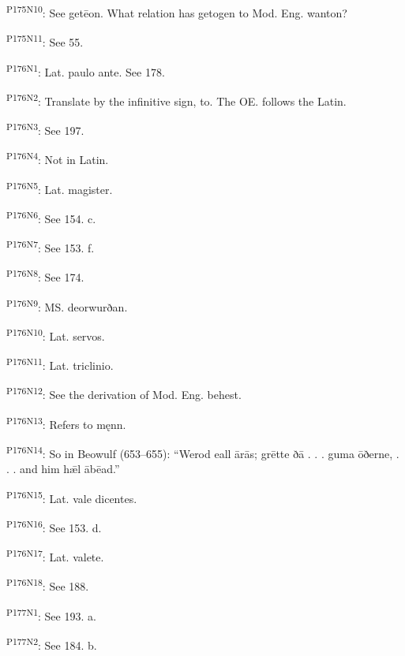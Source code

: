 \textsuperscript{P175N10}: See getēon. What relation has getogen to Mod. Eng. wanton?

\textsuperscript{P175N11}: See 55.

\textsuperscript{P176N1}: Lat. paulo ante. See 178.

\textsuperscript{P176N2}: Translate by the infinitive sign, to. The OE. follows the Latin.

\textsuperscript{P176N3}: See 197.

\textsuperscript{P176N4}: Not in Latin.

\textsuperscript{P176N5}: Lat. magister.

\textsuperscript{P176N6}: See 154. c.

\textsuperscript{P176N7}: See 153. f.

\textsuperscript{P176N8}: See 174.

\textsuperscript{P176N9}: MS. deorwurðan.

\textsuperscript{P176N10}: Lat. servos.

\textsuperscript{P176N11}: Lat. triclinio.

\textsuperscript{P176N12}: See the derivation of Mod. Eng. behest.

\textsuperscript{P176N13}: Refers to męnn.

\textsuperscript{P176N14}: So in Beowulf (653–655): “Werod eall ārās; grētte ðā . . . guma ōðerne, . . . and him hǣl ābēad.”

\textsuperscript{P176N15}: Lat. vale dicentes.

\textsuperscript{P176N16}: See 153. d.

\textsuperscript{P176N17}: Lat. valete.

\textsuperscript{P176N18}: See 188.

\textsuperscript{P177N1}: See 193. a.

\textsuperscript{P177N2}: See 184. b.

\endgroup

